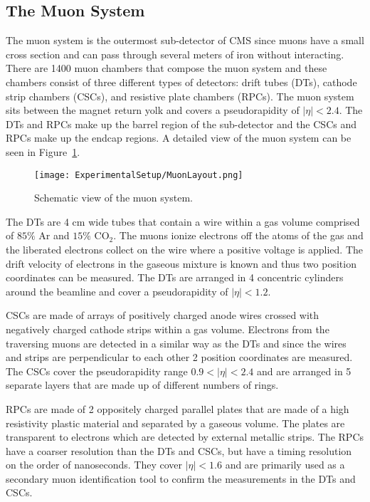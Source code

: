 \subsection{The Muon System}

The muon system is the outermost sub-detector of CMS since muons have a small cross section and can pass through several meters of iron without interacting. There are 1400 muon chambers that compose the muon system and these chambers consist of three different types of detectors: drift tubes (DTs), cathode strip chambers (CSCs), and resistive plate chambers (RPCs). The muon system sits between the magnet return yolk and covers a pseudorapidity of $|\eta| < 2.4$. The DTs and RPCs make up the barrel region of the sub-detector and the CSCs and RPCs make up the endcap regions. A detailed view of the muon system can be seen in Figure~\ref{fig:MuonSchematic}\cite{CMSExperiment}.

\begin{figure}[h!]
\texttt{[image: ExperimentalSetup/MuonLayout.png]}
\caption{Schematic view of the muon system.}
\label{fig:MuonSchematic}
\end{figure}

The DTs are 4 cm wide tubes that contain a wire within a gas volume comprised of $85\%$ Ar and $15\%$ $\mathrm{CO}_{2}$. The muons ionize electrons off the atoms of the gas and the liberated electrons collect on the wire where a positive voltage is applied. The drift velocity of electrons in the gaseous mixture is known and thus two position coordinates can be measured. The DTs are arranged in 4 concentric cylinders around the beamline and cover a pseudorapidity of $|\eta| < 1.2$. 

CSCs are made of arrays of positively charged anode wires crossed with negatively charged cathode strips within a gas volume. Electrons from the traversing muons are detected in a similar way as the DTs and since the wires and strips are perpendicular to each other 2 position coordinates are measured. The CSCs cover the pseudorapidity range $0.9 < |\eta| < 2.4$ and are arranged in 5 separate layers that are made up of different numbers of rings.

RPCs are made of 2 oppositely charged parallel plates that are made of a high resistivity plastic material and separated by a gaseous volume. The plates are transparent to electrons which are detected by external metallic strips. The RPCs have a coarser resolution than the DTs and CSCs, but have a timing resolution on the order of nanoseconds. They cover $|\eta| < 1.6$ and are primarily used as a secondary muon identification tool to confirm the measurements in the DTs and CSCs. 

